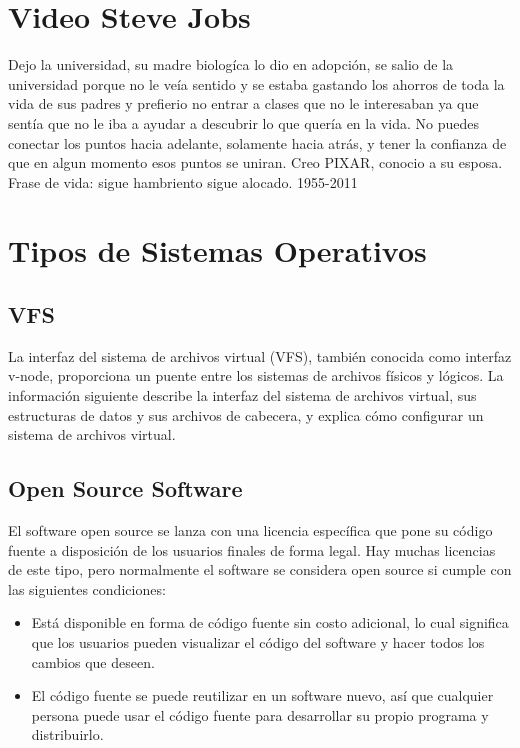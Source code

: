 \documentclass[11pt,twoside]{book}
\begin{document}
\section{Video Steve Jobs}
Dejo la universidad, su madre biologíca lo dio en adopción, se salio de la universidad porque no le veía sentido y se estaba gastando los ahorros de toda la vida de sus padres y prefierio no entrar a clases que no le interesaban ya que sentía que no le iba a ayudar a descubrir lo que quería en la vida. No puedes conectar los puntos hacia adelante, solamente hacia atrás, y tener la confianza de que en algun momento esos puntos se uniran. Creo PIXAR, conocio a su esposa. Frase de vida: sigue hambriento sigue alocado. 1955-2011

\section{Tipos de Sistemas Operativos}
\subsection{VFS}
La interfaz del sistema de archivos virtual (VFS), también conocida como interfaz v-node, proporciona un puente entre los sistemas de archivos físicos y lógicos. La información siguiente describe la interfaz del sistema de archivos virtual, sus estructuras de datos y sus archivos de cabecera, y explica cómo configurar un sistema de archivos virtual.

\subsection{Open Source Software}
El software open source se lanza con una licencia específica que pone su código fuente a disposición de los usuarios finales de forma legal. Hay muchas licencias de este tipo, pero normalmente el software se considera open source si cumple con las siguientes condiciones:

\begin{itemize}

\item  Está disponible en forma de código fuente sin costo adicional, lo cual significa que los usuarios pueden visualizar el código del software y hacer todos los cambios que deseen.

\item El código fuente se puede reutilizar en un software nuevo, así que cualquier persona puede usar el código fuente para desarrollar su propio programa y distribuirlo.

\end{itemize}
\end{document}
